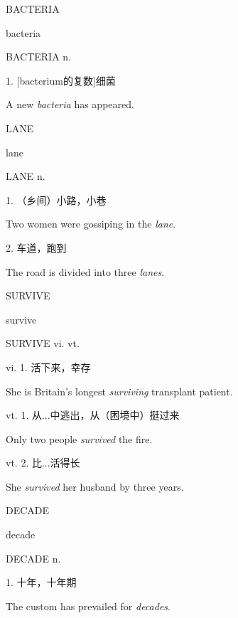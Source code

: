 \begin{flashcard}{
BACTERIA

bacteria
}
\begin{center}
BACTERIA n. 
\end{center}
1. [bacterium的复数]细菌

A new \textit{bacteria} has appeared.

\end{flashcard}
\begin{flashcard}{
LANE

lane
}
\begin{center}
LANE n. \textipa{[lein]}
\end{center}
1. （乡间）小路，小巷

Two women were gossiping in the \textit{lane}.

2. 车道，跑到

The road is divided into three \textit{lanes}.

\end{flashcard}
\begin{flashcard}{
SURVIVE

survive
}
\begin{center}
SURVIVE vi. vt. 
\end{center}
vi. 1. 活下来，幸存

She is Britain's longest \textit{surviving} transplant patient.

vt. 1. 从...中逃出，从（困境中）挺过来

Only two people \textit{survived} the fire.

vt. 2. 比...活得长

She \textit{survived} her husband by three years.

\end{flashcard}
\begin{flashcard}{
DECADE

decade
}
\begin{center}
DECADE n. 
\end{center}
1. 十年，十年期

The custom has prevailed for \textit{decades}.

\end{flashcard}
